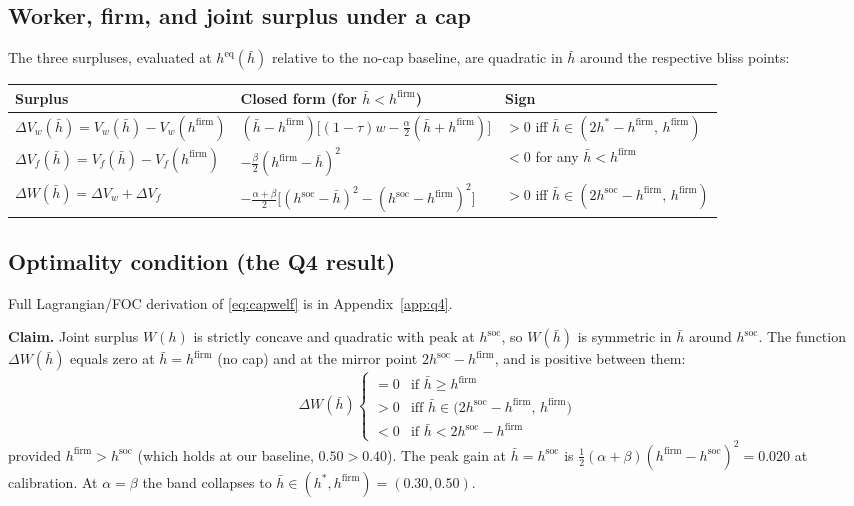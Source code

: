 \documentclass[a4paper,11pt]{article}
\begin{document}
\subsection{Worker, firm, and joint surplus under a cap}
The three surpluses, evaluated at $h^{\mathrm{eq}}(\bar h)$ relative to the no-cap baseline, are quadratic in $\bar h$ around the respective bliss points:
\begin{center}\footnotesize
\begin{tabular}{lll}
\toprule
Surplus & Closed form (for $\bar h<h^{\mathrm{firm}}$) & Sign \\
\midrule
$\Delta V_w(\bar h)=V_w(\bar h)-V_w(h^{\mathrm{firm}})$ & $(\bar h-h^{\mathrm{firm}})\bigl[(1-\tau)w-\tfrac{\alpha}{2}(\bar h+h^{\mathrm{firm}})\bigr]$ & $>0$ iff $\bar h\!\in\!(2h^{*}-h^{\mathrm{firm}},\,h^{\mathrm{firm}})$\\
$\Delta V_f(\bar h)=V_f(\bar h)-V_f(h^{\mathrm{firm}})$ & $-\tfrac{\beta}{2}(h^{\mathrm{firm}}-\bar h)^{2}$ & $<0$ for any $\bar h<h^{\mathrm{firm}}$\\
$\Delta W(\bar h)=\Delta V_w+\Delta V_f$ & $-\tfrac{\alpha+\beta}{2}\bigl[(h^{\mathrm{soc}}-\bar h)^{2}-(h^{\mathrm{soc}}-h^{\mathrm{firm}})^{2}\bigr]$ & $>0$ iff $\bar h\!\in\!(2h^{\mathrm{soc}}-h^{\mathrm{firm}},\,h^{\mathrm{firm}})$\\
\bottomrule
\end{tabular}
\end{center}

\subsection{Optimality condition (the Q4 result)}
Full Lagrangian/FOC derivation of \eqref{eq:capwelf} is in Appendix~\ref{app:q4}.

\textbf{Claim.} Joint surplus $W(h)$ is strictly concave and quadratic with peak at $h^{\mathrm{soc}}$, so $W(\bar h)$ is symmetric in $\bar h$ around $h^{\mathrm{soc}}$. The function $\Delta W(\bar h)$ equals zero at $\bar h\!=\!h^{\mathrm{firm}}$ (no cap) and at the mirror point $2h^{\mathrm{soc}}\!-\!h^{\mathrm{firm}}$, and is positive between them:
\begin{equation}
\Delta W(\bar h)   \begin{cases} =0 & \text{if } \bar h\geq h^{\mathrm{firm}}\\ >0 & \text{iff } \bar h\in\bigl(2h^{\mathrm{soc}}-h^{\mathrm{firm}},\,h^{\mathrm{firm}}\bigr)\\ <0 & \text{if } \bar h<2h^{\mathrm{soc}}-h^{\mathrm{firm}} \end{cases}
\label{eq:capwelf}
\end{equation}
provided $h^{\mathrm{firm}}>h^{\mathrm{soc}}$ (which holds at our baseline, $0.50\!>\!0.40$). The peak gain at $\bar h\!=\!h^{\mathrm{soc}}$ is $\tfrac{1}{2}(\alpha+\beta)(h^{\mathrm{firm}}-h^{\mathrm{soc}})^{2}\!=\!0.020$ at calibration. At $\alpha\!=\!\beta$ the band collapses to $\bar h\!\in\!(h^*,h^{\mathrm{firm}})\!=\!(0.30,0.50)$.
\end{document}
